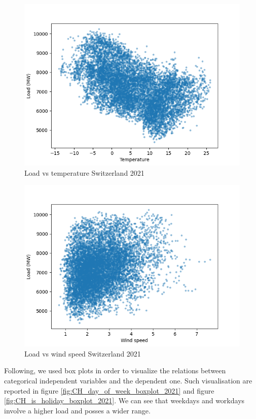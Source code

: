 \begin{figure}[!h]
    \includegraphics[width=\textwidth]{images/CH_load_vs_temperature_2021.png}
    \caption{Load vs temperature Switzerland 2021}
    \label{fig:CH_load_vs_temperature_2021}
\end{figure}

\begin{figure}[!h]
    \includegraphics[width=\textwidth]{images/CH_load_vs_wind_speed_2021.png}
    \caption{Load vs wind speed Switzerland 2021}
    \label{fig:CH_load_vs_wind_speed_2021}
\end{figure}

Following, we used box plots in order to visualize the relations between categorical independent variables and the dependent one. Such visualisation are reported in figure \ref{fig:CH_day_of_week_boxplot_2021} and figure \ref{fig:CH_is_holiday_boxplot_2021}. We can see that weekdays and workdays involve a higher load and posses a wider range.

